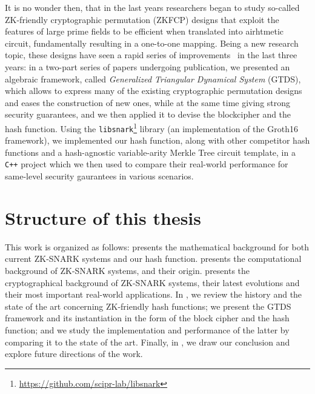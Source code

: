 It is no wonder then, that in the last years researchers began to study so-called ZK-friendly 
cryptographic permutation (ZKFCP) designs that exploit the features of large prime fields to be 
efficient when translated into airhtmetic circuit, fundamentally resulting in a one-to-one mapping.
Being a new research topic, these designs have seen a rapid series of 
improvements~\cite{AlbrechtGRRT2016,GrassiKRRS2021,GrassiHRSWW2022} in the last three years:
in a two-part series of papers undergoing publication, we presented an algebraic 
framework, called \emph{Generalized Triangular Dynamical System} (GTDS), which allows to express
many of the existing cryptographic permutation designs and eases the construction of new ones, while
at the same time giving strong security guarantees, and we then applied it to devise the \Arion{}
blockcipher and the \ArionHash{} hash function.
Using the \texttt{libsnark}\footnote{\url{https://github.com/scipr-lab/libsnark}} library (an 
implementation of the Groth16 framework), we implemented our hash function, along with other 
competitor hash functions and a hash-agnostic variable-arity Merkle Tree circuit template, in a 
\texttt{C++} project which we then used to compare their real-world performance for same-level 
security gaurantees in various scenarios.

\section*{Structure of this thesis}
This work is organized as follows:  presents the mathematical background for 
both current ZK-SNARK systems and our hash function.
 presents the computational background of ZK-SNARK systems, and their origin.
 presents the cryptographical background of ZK-SNARK systems, their latest 
evolutions and their most important real-world applications.
In , we review the history and the state of the art concerning ZK-friendly hash 
functions; we present the GTDS framework and its instantiation in the form of the \Arion{} block 
cipher and the \ArionHash{} hash function; and we study the implementation and performance 
of the latter by comparing it to the state of the art. 
Finally, in , we draw our conclusion and explore future directions of the 
work.
